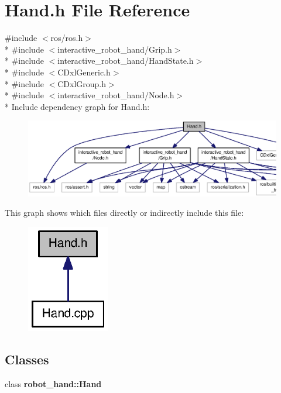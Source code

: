 \section{Hand.\-h File Reference}
\label{Hand_8h}
{\ttfamily \#include $<$ros/ros.\-h$>$}\\*
{\ttfamily \#include $<$interactive\-\_\-robot\-\_\-hand/\-Grip.\-h$>$}\\*
{\ttfamily \#include $<$interactive\-\_\-robot\-\_\-hand/\-Hand\-State.\-h$>$}\\*
{\ttfamily \#include $<$C\-Dxl\-Generic.\-h$>$}\\*
{\ttfamily \#include $<$C\-Dxl\-Group.\-h$>$}\\*
{\ttfamily \#include $<$interactive\-\_\-robot\-\_\-hand/\-Node.\-h$>$}\\*
Include dependency graph for Hand.\-h\-:\nopagebreak
\begin{figure}[H]
\begin{center}
\leavevmode
\includegraphics[width=350pt]{Hand_8h__incl}
\end{center}
\end{figure}
This graph shows which files directly or indirectly include this file\-:\nopagebreak
\begin{figure}[H]
\begin{center}
\leavevmode
\includegraphics[width=102pt]{Hand_8h__dep__incl}
\end{center}
\end{figure}
\subsection*{Classes}
\begin{DoxyCompactItemize}
\item 
class {\bf robot\-\_\-hand\-::\-Hand}
\end{DoxyCompactItemize}

